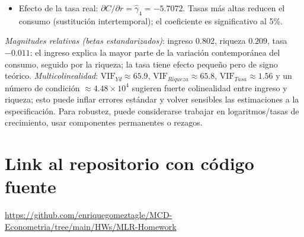 \documentclass[10pt]{article}
\begin{document}
\begin{enumerate}
{\begin{itemize}
        \item Efecto de la tasa real: \(\partial C/\partial r=\hat\gamma_4=-5.7072\). Tasas más altas reducen el consumo (sustitución intertemporal); el coeficiente es significativo al 5\%.
        \end{itemize}
        \emph{Magnitudes relativas (betas estandarizados)}: ingreso \(0.802\), riqueza \(0.209\), tasa \(-0.011\): el ingreso explica la mayor parte de la variación contemporánea del consumo, seguido por la riqueza; la tasa tiene efecto pequeño pero de signo teórico.
        \emph{Multicolinealidad}: \(\text{VIF}_{Yd}\approx 65.9\), \(\text{VIF}_{Riqueza}\approx 65.8\), \(\text{VIF}_{Tasa}\approx 1.56\) y un número de condición \(\approx 4.48\times10^{4}\) sugieren fuerte colinealidad entre ingreso y riqueza; esto puede inflar errores estándar y volver sensibles las estimaciones a la especificación. Para robustez, puede considerarse trabajar en logaritmos/tasas de crecimiento, usar componentes permanentes o rezagos.
    }
\end{enumerate}
\section{Link al repositorio con código fuente}
\url{https://github.com/enriquegomeztagle/MCD-Econometria/tree/main/HWs/MLR-Homework}
\end{document}

